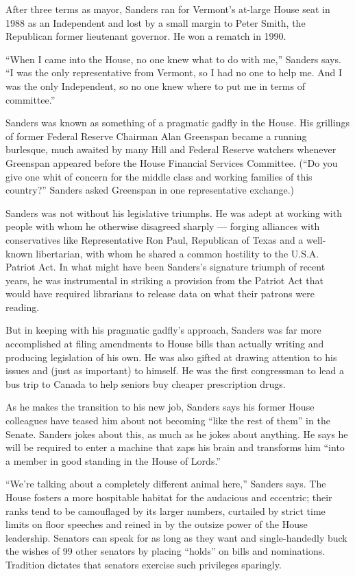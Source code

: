 After three terms as mayor, Sanders ran for Vermont's at-large House
seat in 1988 as an Independent and lost by a small margin to Peter
Smith, the Republican former lieutenant governor. He won a rematch in
1990.

``When I came into the House, no one knew what to do with me,'' Sanders
says. ``I was the only representative from Vermont, so I had no one to
help me. And I was the only Independent, so no one knew where to put me
in terms of committee.''

Sanders was known as something of a pragmatic gadfly in the House. His
grillings of former Federal Reserve Chairman Alan Greenspan became a
running burlesque, much awaited by many Hill and Federal Reserve
watchers whenever Greenspan appeared before the House Financial Services
Committee. (``Do you give one whit of concern for the middle class and
working families of this country?'' Sanders asked Greenspan in one
representative exchange.)

Sanders was not without his legislative triumphs. He was adept at
working with people with whom he otherwise disagreed sharply --- forging
alliances with conservatives like Representative Ron Paul, Republican of
Texas and a well-known libertarian, with whom he shared a common
hostility to the U.S.A. Patriot Act. In what might have been Sanders's
signature triumph of recent years, he was instrumental in striking a
provision from the Patriot Act that would have required librarians to
release data on what their patrons were reading.

But in keeping with his pragmatic gadfly's approach, Sanders was far
more accomplished at filing amendments to House bills than actually
writing and producing legislation of his own. He was also gifted at
drawing attention to his issues and (just as important) to himself. He
was the first congressman to lead a bus trip to Canada to help seniors
buy cheaper prescription drugs.

As he makes the transition to his new job, Sanders says his former House
colleagues have teased him about not becoming ``like the rest of them''
in the Senate. Sanders jokes about this, as much as he jokes about
anything. He says he will be required to enter a machine that zaps his
brain and transforms him ``into a member in good standing in the House
of Lords.''

``We're talking about a completely different animal here,'' Sanders
says. The House fosters a more hospitable habitat for the audacious and
eccentric; their ranks tend to be camouflaged by its larger numbers,
curtailed by strict time limits on floor speeches and reined in by the
outsize power of the House leadership. Senators can speak for as long as
they want and single-handedly buck the wishes of 99 other senators by
placing ``holds'' on bills and nominations. Tradition dictates that
senators exercise such privileges sparingly.

